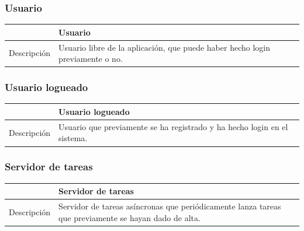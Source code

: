 \subsubsection{Usuario}

\begin{center}
  \begin{tabularx}{\textwidth}{|c|X|}
    \hline
     & Usuario \\

    \hline

    Descripción & Usuario libre de la aplicación, que puede haber hecho login previamente o no. \\

    \hline
  \end{tabularx}

\end{center}


\subsubsection{Usuario logueado}

\begin{center}
  \centering
  \begin{tabularx}{\textwidth}{|c|X|}
    \hline
     & Usuario logueado \\

    \hline

    Descripción & Usuario que previamente se ha registrado y ha hecho login en el sistema. \\

    \hline
  \end{tabularx}
\end{center}

\subsubsection{Servidor de tareas}

\begin{center}
  \centering
  \begin{tabularx}{\textwidth}{|c|X|}
    \hline
     & Servidor de tareas \\

    \hline

    Descripción & Servidor de tareas asíncronas que periódicamente lanza tareas que previamente se hayan dado de alta. \\

    \hline
  \end{tabularx}
\end{center}

